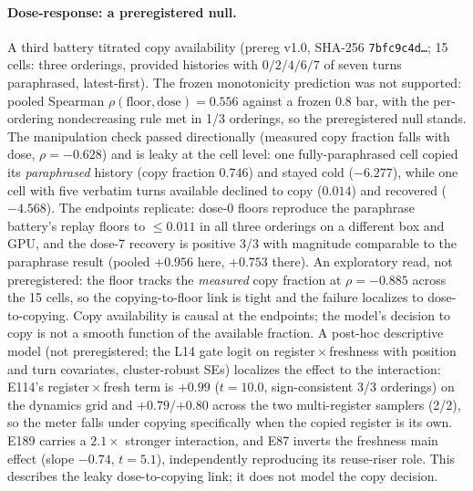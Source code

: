 \documentclass[10pt,a4paper,twocolumn]{article}
\begin{document}
\paragraph{Dose-response: a preregistered null.}
A third battery titrated copy availability (prereg v1.0, SHA-256
\texttt{7bfc9c4d\ldots}; 15 cells: three orderings, provided histories with
$0/2/4/6/7$ of seven turns paraphrased, latest-first). The frozen monotonicity
prediction was not supported: pooled Spearman
$\rho(\text{floor},\text{dose}){=}0.556$ against a frozen $0.8$ bar, with the
per-ordering nondecreasing rule met in 1/3 orderings, so the preregistered
null stands. The manipulation check passed directionally (measured copy
fraction falls with dose, $\rho{=}{-}0.628$) and is leaky at the cell level:
one fully-paraphrased cell copied its \emph{paraphrased} history (copy
fraction $0.746$) and stayed cold ($-6.277$), while one cell with five
verbatim turns available declined to copy ($0.014$) and recovered ($-4.568$).
The endpoints replicate: dose-0 floors reproduce the paraphrase battery's
replay floors to $\le 0.011$ in all three orderings on a different box and
GPU, and the dose-7 recovery is positive 3/3 with magnitude comparable to the
paraphrase result (pooled $+0.956$ here, $+0.753$ there). An exploratory read,
not preregistered: the floor tracks the \emph{measured} copy fraction at
$\rho{=}{-}0.885$ across the 15 cells, so the copying-to-floor link is tight
and the failure localizes to dose-to-copying. Copy availability is causal at
the endpoints; the model's decision to copy is not a smooth function of the
available fraction. A post-hoc descriptive model (not preregistered; the L14 gate logit on
register${}\times{}$freshness with position and turn covariates, cluster-robust
SEs) localizes the effect to the interaction: E114's register${}\times{}$fresh
term is $+0.99$ ($t{=}10.0$, sign-consistent 3/3 orderings) on the dynamics
grid and $+0.79$/$+0.80$ across the two multi-register samplers (2/2), so the
meter falls under copying specifically when the copied register is its own.
E189 carries a $2.1\times$ stronger interaction, and E87 inverts the freshness
main effect (slope $-0.74$, $t{=}5.1$), independently reproducing its
reuse-riser role. This describes the leaky dose-to-copying link; it does not
model the copy decision.
\end{document}
